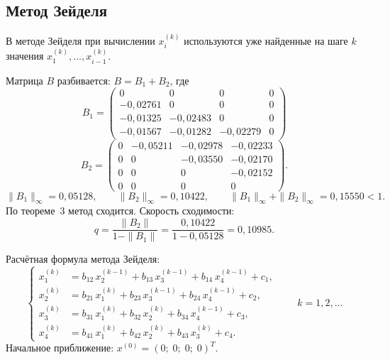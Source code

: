 \documentclass[a4paper, final]{article}
\begin{document}
\newpage

\subsection{Метод Зейделя}

В методе Зейделя при вычислении $x_i^{(k)}$ используются
уже найденные на шаге $k$ значения $x_1^{(k)},\ldots,x_{i-1}^{(k)}$.

Матрица $B$ разбивается: $B = B_1 + B_2$, где
\[
B_1 = \begin{pmatrix}
0          & 0          & 0          & 0 \\
-0{,}02761 & 0          & 0          & 0 \\
-0{,}01325 & -0{,}02483 & 0          & 0 \\
-0{,}01567 & -0{,}01282 & -0{,}02279 & 0
\end{pmatrix} \]
\[
B_2 = \begin{pmatrix}
0 & -0{,}05211 & -0{,}02978 & -0{,}02233 \\
0 & 0          & -0{,}03550 & -0{,}02170 \\
0 & 0          & 0          & -0{,}02152 \\
0 & 0          & 0          & 0
\end{pmatrix}.
\]
\[
\|B_1\|_\infty = 0{,}05128,\qquad \|B_2\|_\infty = 0{,}10422,\qquad
\|B_1\|_\infty+\|B_2\|_\infty = 0{,}15550 < 1.
\]
По теореме~3 метод сходится. Скорость сходимости:
\[
q = \frac{\|B_2\|}{1-\|B_1\|} = \frac{0{,}10422}{1-0{,}05128} = 0{,}10985.
\]

Расчётная формула метода Зейделя:
\[
\left\{
\begin{aligned}
x_1^{(k)} &= b_{12}\,x_2^{(k-1)} + b_{13}\,x_3^{(k-1)} + b_{14}\,x_4^{(k-1)} + c_1,\\
x_2^{(k)} &= b_{21}\,x_1^{(k)} + b_{23}\,x_3^{(k-1)} + b_{24}\,x_4^{(k-1)} + c_2,\\
x_3^{(k)} &= b_{31}\,x_1^{(k)} + b_{32}\,x_2^{(k)} + b_{34}\,x_4^{(k-1)} + c_3,\\
x_4^{(k)} &= b_{41}\,x_1^{(k)} + b_{42}\,x_2^{(k)} + b_{43}\,x_3^{(k)} + c_4.
\end{aligned}
\right.\qquad k=1,2,\ldots
\]
Начальное приближение: $x^{(0)} = (0;\;0;\;0;\;0)^T$.
\end{document}
